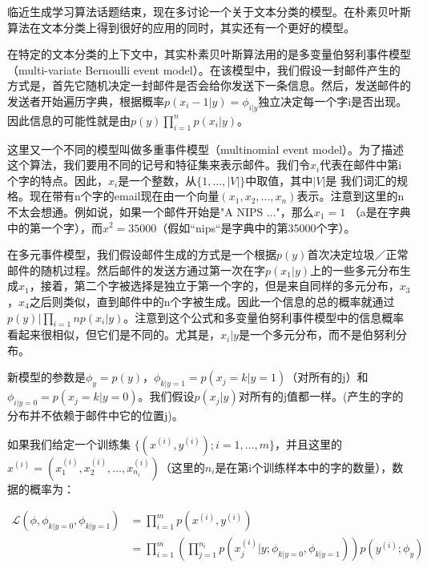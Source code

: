 \documentclass[UTF8]{ctexart}
\begin{document}
临近生成学习算法话题结束，现在多讨论一个关于文本分类的模型。在朴素贝叶斯算法在文本分类上得到很好的应用的同时，其实还有一个更好的模型。

在特定的文本分类的上下文中，其实朴素贝叶斯算法用的是多变量伯努利事件模型（multi-variate Bernoulli event model）。在该模型中，我们假设一封邮件产生的方式是，首先它随机决定一封邮件是否会给你发送下一条信息。然后，发送邮件的发送者开始遍历字典，根据概率$p(x_{i}-1|y) = \phi_{i|y}$独立决定每一个字i是否出现。因此信息的可能性就是由$p(y)\prod_{i=1}^{n} p(x_{i}|y)$。

这里又一个不同的模型叫做多重事件模型（multinomial event model）。为了描述这个算法，我们要用不同的记号和特征集来表示邮件。我们令$x_{i}$代表在邮件中第i个字的特点。因此，$x_{i}$是一个整数，从$\{ 1,...,|V|\}$中取值，其中$|V|$是 我们词汇的规格。现在带有n个字的email现在由一个向量$(x_{1},x_{2},...,x_{n})$表示。注意到这里的n不太会想通。例如说，如果一个邮件开始是"A NIPS ..."，那么$x_{1} = 1$ （a是在字典中的第一个字），而$x^{2}= 35000$（假如“nips“是字典中的第35000个字）。


在多元事件模型，我们假设邮件生成的方式是一个根据$p(y)$首次决定垃圾／正常邮件的随机过程。然后邮件的发送方通过第一次在字$p(x_{1}|y)$上的一些多元分布生成$x_{1}$，接着，第二个字被选择是独立于第一个字的，但是来自同样的多元分布，$x_{3}$，$x_{4}$之后则类似，直到邮件中的n个字被生成。因此一个信息的总的概率就通过$p(y)|\prod_{i=1}{n}p(x_{i}|y)$。注意到这个公式和多变量伯努利事件模型中的信息概率看起来很相似，但它们是不同的。尤其是，$x_{i}|y$是一个多元分布，而不是伯努利分布。

新模型的参数是$\phi_{y}=p(y)$，$\phi_{k|y=1} = p(x_{j}=k|y=1)$（对所有的j）和$\phi_{i|y=0}=p(x_{j}=k|y=0)$。我们假设$p(x_{j}|y)$对所有的j值都一样。(产生的字的分布并不依赖于邮件中它的位置j)。

如果我们给定一个训练集 $\{(x^{(i)},y^{(i)});i=1,...,m \}$，并且这里的$x^{(i)}=(x_{1}^{(i)},x_{2}^{(i)},...,x_{n_{i}}^{(i)})$（这里的$n_{i}$是在第i个训练样本中的字的数量），数据的概率为：

\begin{align*}
\mathcal{L} (\phi,\phi_{k|y=0},\phi_{k|y=1}) & = \prod_{i=1}^{m} p(x^{(i)},y^{(i)}) \\
& = \prod_{i=1}^{m} (  \prod_{j=1}^{n_{i}}  p(  x_{j}^{(i)} | y;  \phi_{k|y=0},\phi_{k|y=1}   )  )  p( y^{(i)} ; \phi_{y} )
\end{align*}
\end{document}
